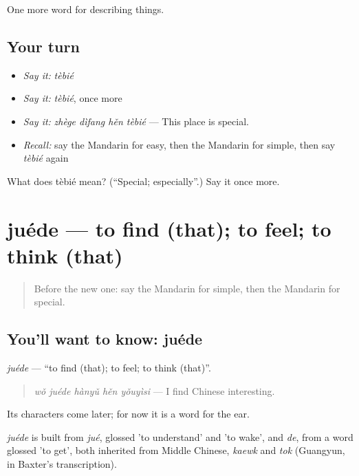 \begin{grammarlens}[title={What you've built}]
One more word for describing things.
\end{grammarlens}

\subsection*{Your turn}
\begin{itemize}
\raggedright
  \item \emph{Say it:} \emph{tèbié}
  \item \emph{Say it:} \emph{tèbié}, once more
  \item \emph{Say it:} \emph{zhège dìfang hěn tèbié} — This place is special.
  \item \emph{Recall:} say the Mandarin for easy, then the Mandarin for simple, then say \emph{tèbié} again
\end{itemize}

\begin{tcolorbox}[breakable,colback=teal!4,colframe=teal!35!black,title={Before you move on}]
What does tèbié mean? (\textquotedblleft{}Special; especially\textquotedblright{}.) Say it once more.
\end{tcolorbox}
\section[juéde]{juéde — to find (that); to feel; to think (that)}

\label{lesson:ZH-C144-juede}



\begin{quote}
Before the new one: say the Mandarin for simple, then the Mandarin for special.
\end{quote}

\subsection*{You'll want to know: juéde}
\emph{juéde} — \textquotedblleft{}to find (that); to feel; to think (that)\textquotedblright{}.

\begin{quote}
\emph{wǒ juéde hànyǔ hěn yǒuyìsi} — I find Chinese interesting.
\end{quote}

Its characters come later; for now it is a word for the ear.

\begin{cousinweb}
\emph{juéde} is built from \emph{jué}, glossed 'to understand' and 'to wake', and \emph{de}, from a word glossed 'to get', both inherited from Middle Chinese, \emph{kaewk} and \emph{tok} (Guangyun, in Baxter's transcription).
\end{cousinweb}

